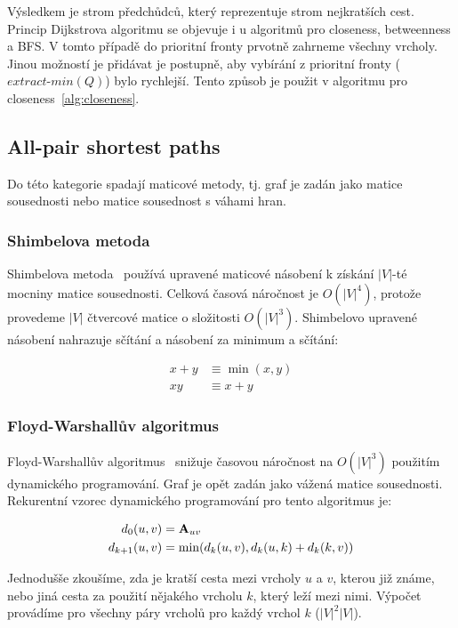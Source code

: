 \documentclass{bakalarka}
\begin{document}
Výsledkem je strom předchůdců, který reprezentuje strom nejkratších cest.
Princip Dijkstrova algoritmu se objevuje i u algoritmů pro closeness,
betweenness a BFS. V tomto případě do prioritní fronty prvotně zahrneme všechny
vrcholy. Jinou možností je přidávat je postupně, aby vybírání z prioritní
fronty ($extract\mbox{-}min(Q)$) bylo rychlejší. Tento způsob je použit v
algoritmu pro closeness~\ref{alg:closeness}.


\subsection{All-pair shortest paths}
Do této kategorie spadají maticové metody, tj. graf je zadán jako matice
sousednosti nebo matice sousednost s váhami hran.


\subsubsection{Shimbelova metoda}
Shimbelova metoda~\citep{shimbel1955} používá upravené maticové násobení k
získání $|V|$-té mocniny matice sousednosti. Celková časová náročnost je
$O(|V|^4)$, protože provedeme $|V|$  čtvercové matice o složitosti
$O(|V|^3)$.  Shimbelovo upravené násobení nahrazuje sčítání a násobení za
minimum a sčítání:

\begin{align*}
x + y &\equiv \min(x, y) \\
xy &\equiv x + y
\end{align*}

\subsubsection{Floyd-Warshallův algoritmus}
Floyd-Warshallův algoritmus~\citep{CLRS,floydwarshall1962} snižuje časovou
náročnost na $O(|V|^3)$ použitím dynamického programování. Graf je opět zadán
jako vážená matice sousednosti. Rekurentní vzorec dynamického programování pro
tento algoritmus je:

\begin{align*}
d_0(u, v) &= {\bf A}_{uv} \\
d_{k + 1}(u, v) &= \min(d_k(u, v), d_k(u, k) + d_k(k, v)) \\
\end{align*}

Jednodušše zkoušíme, zda je kratší cesta mezi vrcholy $u$ a $v$, kterou již
známe, nebo jiná cesta za použití nějakého vrcholu $k$, který leží mezi nimi.
Výpočet provádíme pro všechny páry vrcholů pro každý vrchol $k$ ($|V|^2 |V|$).
\end{document}
